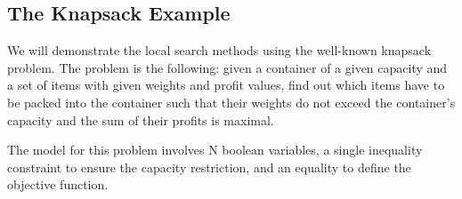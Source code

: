 \subsection{The Knapsack Example}

We will demonstrate the local search methods using the well-known
knapsack problem. The problem is the following: given a container of
a given capacity and a set of items with given weights and profit
values, find out which items have to be packed into the container
such that their weights do not exceed the container's capacity and
the sum of their profits is maximal.

The model for this problem involves N boolean variables, a single
inequality constraint to ensure the capacity restriction, and an
equality to define the objective function.

